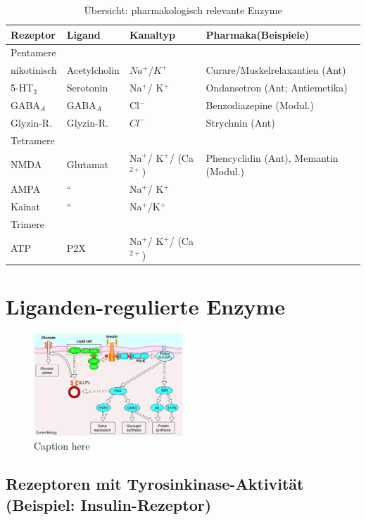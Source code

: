 \documentclass[10pt,a4paper]{report}
\begin{document}
\begin{table}
	\centering
	\begin{longtable}{lllp{4cm}}
		\toprule
		Rezeptor&Ligand&Kanaltyp&Pharmaka(Beispiele)\\ \midrule \addlinespace
		Pentamere&&&\\ \midrule 
		nikotinisch&Acetylcholin&$Na^+/ K^+$&Curare/Muskelrelaxantien (Ant)\\
		5-HT$_3$&Serotonin&Na$^+$/ K$^+$&Ondansetron (Ant; Antiemetika)\\
		GABA$_A$&GABA$_A$&Cl$^-$&Benzodiazepine (Modul.)\\
		Glyzin-R.&Glyzin-R.&$Cl^-$&Strychnin (Ant)\\ \addlinespace
		Tetramere&&&\\ \midrule
		NMDA&Glutamat&Na$^+$/ K$^+$/ (Ca$^{2+}$)&Phencyclidin (Ant), Memantin (Modul.)\\
		AMPA&“&Na$^+$/ K$^+$&\\
		Kainat&“&Na$^+$/K$^+$&\\
		Trimere&&&\\
		ATP&P2X&Na$^+$/ K$^+$/ (Ca$^{2+}$)&\\
		\bottomrule
	\end{longtable}
	\caption{Übersicht: pharmakologisch relevante Enzyme}
 	\label{tab:relevante_enzyme}
\end{table}

\section{Liganden-regulierte Enzyme}
\begin{figure}
	\centering
	\includegraphics[width=0.5\textwidth]{Bilder/ligandenzum.jpeg}
	\caption{Caption here}
	\label{fig:figure1}
\end{figure}

\subsection{Rezeptoren mit Tyrosinkinase-Aktivität (Beispiel: Insulin-Rezeptor)}
\end{document}
